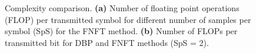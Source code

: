 \begin{figure}[htbp]
\begin{minipage}[h]{.49\linewidth}
\end{minipage}
\begin{minipage}[h]{.49\linewidth}
\end{minipage}
	\caption{Complexity comparison. \textbf{(a)} Number of floating point operations (FLOP) per transmitted symbol for different number of samples per symbol (SpS) for the FNFT method. \textbf{(b)} Number of FLOPs per transmitted bit for DBP and FNFT methods (SpS = 2).}
	\label{fig:complexity}
\end{figure}


